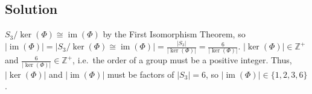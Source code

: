 \documentclass[fleqn]{article}
\DeclareMathOperator{\im}{im}
\begin{document}
        \subsection{Solution}
        $S_3/\ker(\Phi) \cong \im(\Phi)$ by the First Isomorphism Theorem, so $|\im(\Phi)| = |S_3/\ker(\Phi) \cong \im(\Phi)| = \frac{|S_3|}{|\ker(\Phi)|} = \frac{6}{|\ker(\Phi)|}$.  $|\ker(\Phi)| \in \mathbb{Z}^+$ and $\frac{6}{|\ker(\Phi)|} \in \mathbb{Z}^+$, i.e.\ the order of a group must be a positive integer.  Thus, $|\ker(\Phi)|$ and $|\im(\Phi)|$ must be factors of $|S_3| = 6$, so $|\im(\Phi)| \in \{1, 2, 3, 6\}$.
    
        
\end{document}
